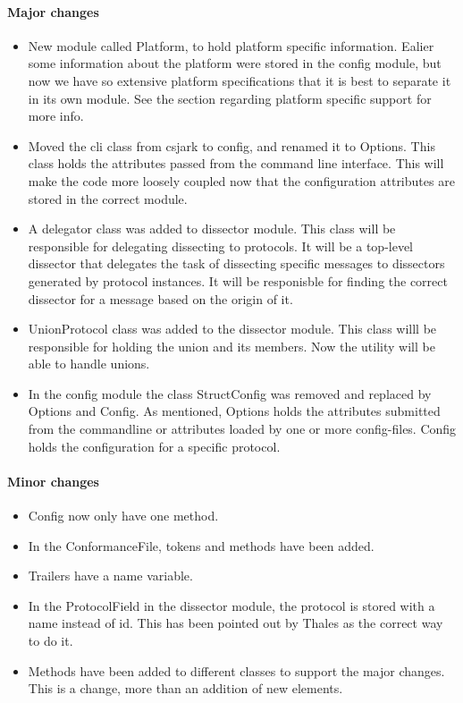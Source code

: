 \paragraph{Major changes}
\begin{itemize}
\item New module called Platform, to hold platform specific information. Ealier some information about the platform were stored in the config module, but now we have so extensive platform specifications that it is best to separate it in its own module. See the section regarding platform specific support for more info.
\item Moved the \gls{cli} class from csjark to config, and renamed it to Options. This class holds the attributes passed from the command line interface. This will make the code more loosely coupled now that the configuration attributes are stored in the correct module. 
\item A delegator class was added to \gls{dissector} module. This class will be responsible for delegating dissecting to \glspl{protocol}. It will be a top-level \gls{dissector} that delegates the task of dissecting specific messages to \glspl{dissector} generated by \gls{protocol} instances. It will be responisble for finding the correct \gls{dissector} for a message based on the origin of it.
\item UnionProtocol class was added to the \gls{dissector} module. This class willl be responsible for holding the \gls{union} and its \glspl{member}. Now the \gls{utility} will be able to handle \glspl{union}. 
\item In the config module the class StructConfig was removed and replaced by Options and Config. As mentioned, Options holds the attributes submitted from the commandline or attributes loaded by one or more config-files. Config holds the configuration for a specific \gls{protocol}.

\end{itemize}

\paragraph{Minor changes}
\begin{itemize}
\item Config now only have one method.
\item In the ConformanceFile, tokens and methods have been added.
\item Trailers have a name variable.
\item In the ProtocolField in the \gls{dissector} module, the \gls{protocol} is stored with a name instead of id. This has been pointed out by Thales as the correct way to do it.
\item Methods have been added to different classes to support the major changes. This is a change, more than an addition of new elements. 
\end{itemize}

